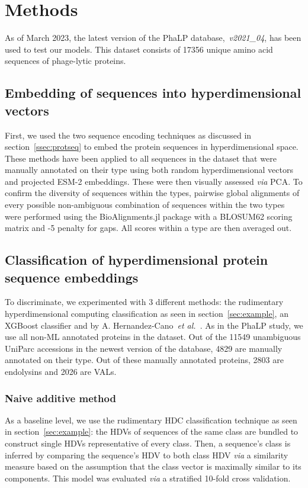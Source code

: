 \section{Methods}
As of March 2023, the latest version of the PhaLP database,~\textit{v2021\_04}, has been used to test our models. This dataset consists of 17356 unique amino acid sequences of phage-lytic proteins.
\subsection*{Embedding of sequences into hyperdimensional vectors}
First, we used the two sequence encoding techniques as discussed in section~\ref{ssec:protseq} to embed the protein sequences in hyperdimensional space. These methods have been applied to all sequences in the dataset that were manually annotated on their type using both random hyperdimensional vectors and projected ESM-2 embeddings. These were then visually assessed \textit{via} PCA. To confirm the diversity of sequences within the types, pairwise global alignments of every possible non-ambiguous combination of sequences within the two types were performed using the BioAlignments.jl package with a BLOSUM62 scoring matrix and -5 penalty for gaps. All scores within a type are then averaged out.

\subsection*{Classification of hyperdimensional protein sequence embeddings}
To discriminate, we experimented with 3 different methods: the rudimentary hyperdimensional computing classification as seen in section~\ref{sec:example}, an XGBoost classifier and  by A. Hernandez-Cano~\textit{et al.}~\cite{onlinehd}. As in the PhaLP study, we use all non-ML annotated proteins in the dataset. Out of the 11549 unambiguous UniParc accessions in the newest version of the database, 4829 are manually annotated on their type. Out of these manually annotated proteins, 2803 are endolysins and 2026 are VALs.
\subsubsection*{Naive additive method}
As a baseline level, we use the rudimentary HDC classification technique as seen in section~\ref{sec:example}: the HDVs of sequences of the same class are bundled to construct single HDVs representative of every class. Then, a sequence's class is inferred by comparing the sequence's HDV to both class HDV \textit{via} a similarity measure based on the assumption that the class vector is maximally similar to its components. This model was evaluated \textit{via} a stratified 10-fold cross validation.
